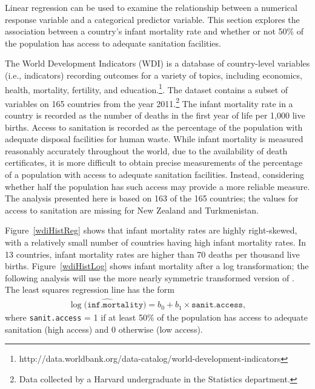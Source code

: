 Linear regression can be used to examine the relationship between a numerical response variable and a categorical predictor variable. This section explores the association between a country's infant mortality rate and whether or not 50\% of the population has access to adequate sanitation facilities. 

The World Development Indicators (WDI) is a database of country-level variables (i.e., indicators) recording outcomes for a variety of topics, including economics, health, mortality, fertility, and education.\footnote{http://data.worldbank.org/data-catalog/world-development-indicators}. The dataset  contains a subset of variables on 165 countries from the year 2011.\footnote{Data collected by a Harvard undergraduate in the Statistics department.} The infant mortality rate in a country is recorded as the number of deaths in the first year of life per 1,000 live births. Access to sanitation is recorded as the percentage of the population with adequate disposal facilities for human waste. While infant mortality is measured reasonably accurately throughout the world, due to the availability of death certificates, it is more difficult to obtain precise measurements of the percentage of a population with access to adequate sanitation facilities. Instead, considering whether half the population has such access may provide a more reliable measure.  The analysis presented here is based on 163 of the 165 countries; the values for access to sanitation are missing for New Zealand and Turkmenistan.

Figure~\ref{wdiHistReg} shows that infant mortality rates are highly right-skewed, with a relatively small number of countries having high infant mortality rates. In 13 countries, infant mortality rates are higher than 70 deaths per thousand live births. Figure~\ref{wdiHistLog} shows infant mortality after a log transformation; the following analysis will use the more nearly symmetric transformed version of .  The least squares regression line has the form
\begin{align}
    \widehat{\log(\texttt{inf.mortality)}} = b_0 + b_1 \times \texttt{sanit.access},
	\label{logInfMortalitySanitRegress}
\end{align}
where \texttt{sanit.access} = 1 if  at least 50\% of the population has access to adequate sanitation (high access) and 0 otherwise (low access).

